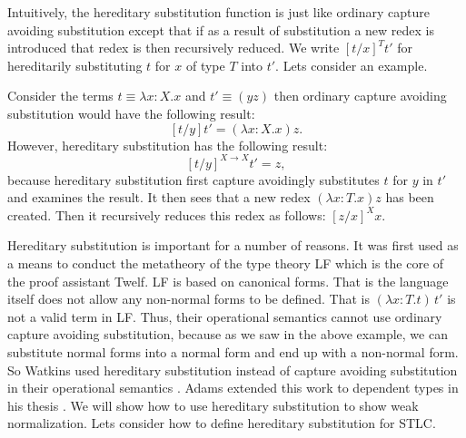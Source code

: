 \documentclass{article}
\begin{document}
Intuitively, the hereditary substitution function is just like
ordinary capture avoiding substitution except that if as a result of
substitution a new redex is introduced that redex is then recursively
reduced.  We write $[t/x]^{T} t'$ for hereditarily substituting $t$ for
$x$ of type $T$ into $t'$.  Lets consider an example.
\begin{example}
  \label{ex:hs}
  Consider the terms $t \equiv \lambda x:X.x$ and $t' \equiv (y z)$
  then ordinary capture avoiding substitution would have the following
  result: $$ [t/y]t' = (\lambda x:X.x) z. $$ However, hereditary
  substitution has the following result: $$[t/y]^{X \to X} t' = z,$$
  because hereditary substitution first capture avoidingly substitutes
  $t$ for $y$ in $t'$ and examines the result. It then sees that a new
  redex $(\lambda x:T.x) z$ has been created.  Then it recursively
  reduces this redex as follows: $[z/x]^X x.$
\end{example}
Hereditary substitution is important for a number of reasons.  It was
first used as a means to conduct the metatheory of the type theory LF
which is the core of the proof assistant Twelf.  LF is based on
canonical forms.  That is the language itself does not allow any
non-normal forms to be defined.  That is $(\lambda x:T.t)\,t'$ is not
a valid term in LF.  Thus, their operational semantics cannot use
ordinary capture avoiding substitution, because as we saw in the above
example, we can substitute normal forms into a normal form and end up
with a non-normal form.  So Watkins used hereditary substitution
instead of capture avoiding substitution in their operational
semantics \cite{Watkins:2004}. Adams extended this work to dependent
types in his thesis \cite{Adams:2004}.  We will show how to use
hereditary substitution to show weak normalization.  Lets consider how
to define hereditary substitution for STLC.
\end{document}

